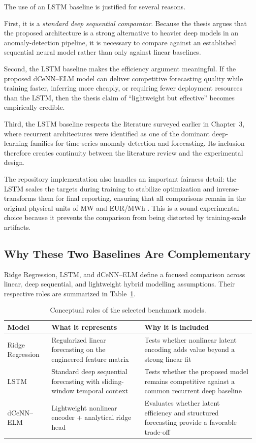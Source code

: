 The use of an LSTM baseline is justified for several reasons.

First, it is a \emph{standard deep sequential comparator}. Because the thesis argues that the proposed architecture is a strong alternative to heavier deep models in an anomaly-detection pipeline, it is necessary to compare against an established sequential neural model rather than only against linear baselines.

Second, the LSTM baseline makes the efficiency argument meaningful. If the proposed dCeNN--ELM model can deliver competitive forecasting quality while training faster, inferring more cheaply, or requiring fewer deployment resources than the LSTM, then the thesis claim of ``lightweight but effective'' becomes empirically credible.

Third, the LSTM baseline respects the literature surveyed earlier in Chapter~3, where recurrent architectures were identified as one of the dominant deep-learning families for time-series anomaly detection and forecasting. Its inclusion therefore creates continuity between the literature review and the experimental design.

The repository implementation also handles an important fairness detail: the LSTM scales the targets during training to stabilize optimization and inverse-transforms them for final reporting, ensuring that all comparisons remain in the original physical units of MW and EUR/MWh \cite{repo_thesis_grid_anomaly}. This is a sound experimental choice because it prevents the comparison from being distorted by training-scale artifacts.

\subsection{Why These Two Baselines Are Complementary}

Ridge Regression, LSTM, and dCeNN--ELM define a focused comparison across linear, deep sequential, and lightweight hybrid modelling assumptions. Their respective roles are summarized in Table~\ref{tab:baseline_roles}.

\begin{table}[H]
	\centering
	\caption{Conceptual roles of the selected benchmark models.}
	\label{tab:baseline_roles}
	\small
	\begin{tabular}{|p{2.8cm}|p{4.0cm}|p{4.0cm}|}
		\hline
		\textbf{Model} & \textbf{What it represents} & \textbf{Why it is included} \\
		\hline
		Ridge Regression & Regularized linear forecasting on the engineered feature matrix & Tests whether nonlinear latent encoding adds value beyond a strong linear fit \\
		\hline
		LSTM & Standard deep sequential forecasting with sliding-window temporal context & Tests whether the proposed model remains competitive against a common recurrent deep baseline \\
		\hline
		dCeNN--ELM & Lightweight nonlinear encoder + analytical ridge head & Evaluates whether latent efficiency and structured forecasting provide a favorable trade-off \\
		\hline
	\end{tabular}
\end{table}

